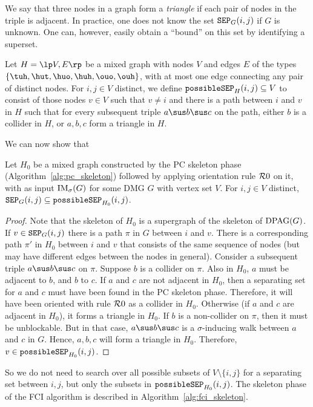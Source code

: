 We say that three nodes in a graph form a \emph{triangle} if each pair of nodes in the triple is adjacent.
In practice, one does not know the set $\mathtt{SEP}_G(i,j)$ if $G$ is unknown.
One can, however, easily obtain a ``bound'' on this set by identifying a superset.
\begin{Def}
  Let $H = \lt V,E\rt$ be a mixed graph with nodes $V$ and edges $E$ of the types $\{\tuh,\hut,\huo,\huh,\ouo,\ouh\}$, with at most one edge connecting any pair of distinct nodes.
  For $i, j \in V$ distinct, we define $\mathtt{possibleSEP}_H(i,j) \subseteq V$ to consist of those nodes
  $v \in V$ such that $v \ne i$ and there is a path between $i$ and $v$ in $H$ such that for
  every subsequent triple $a \sus b \sus c$ on the path, either $b$ is a collider in $H$,
  or $a,b,c$ form a triangle in $H$.
\end{Def}
We can now show that
\begin{Prp}
  Let $H_0$ be a mixed graph constructed by the PC skeleton phase (Algorithm~\ref{alg:pc_skeleton}) followed by applying orientation rule $\mathcal{R}0$ on it, with as input $\mathrm{IM}_\sigma(G)$ for some DMG $G$ with vertex set $V$.
  For $i, j \in V$ distinct, $\mathtt{SEP}_G(i,j) \subseteq \mathtt{possibleSEP}_{H_0}(i,j)$.
\end{Prp}
\begin{proof}
  Note that the skeleton of $H_0$ is a supergraph of the skeleton of $\mathrm{DPAG}(G)$.
  If $v \in \mathtt{SEP}_G(i,j)$ there is a path $\pi$ in $G$ between $i$ and $v$.
  There is a corresponding path $\pi'$ in $H_0$ between $i$ and $v$ that consists of the same sequence of nodes (but may have different edges between the nodes in general).
  Consider a subsequent triple $a \sus b \sus c$ on $\pi$.
  Suppose $b$ is a collider on $\pi$.
  Also in $H_0$, $a$ must be adjacent to $b$, and $b$ to $c$.
  If $a$ and $c$ are not adjacent in $H_0$, then a separating set for $a$ and $c$ must have been found in the PC skeleton phase.
  Therefore, it will have been oriented with rule $\mathcal{R}0$ as a collider in $H_0$.
  Otherwise (if $a$ and $c$ are adjacent in $H_0$), it forms a triangle in $H_0$.
  If $b$ is a non-collider on $\pi$, then it must be unblockable.
  But in that case, $a \sus b \sus c$ is a $\sigma$-inducing walk between $a$ and $c$ in $G$.
  Hence, $a,b,c$ will form a triangle in $H_0$.
  Therefore, $v \in \mathtt{possibleSEP}_{H_0}(i,j)$.
\end{proof}
So we do not need to search over all possible subsets of $V \setminus \{i,j\}$ for a separating set between $i,j$, but only the subsets in $\mathtt{possibleSEP}_{H_0}(i,j)$.
The skeleton phase of the FCI algorithm is described in Algorithm~\ref{alg:fci_skeleton}. 
